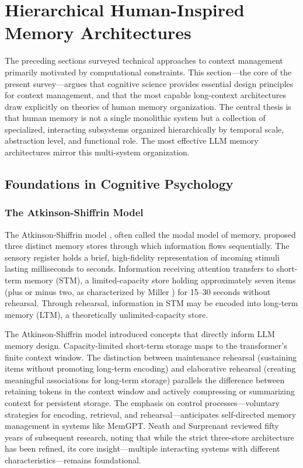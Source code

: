 \documentclass[11pt,letterpaper]{article}
\begin{document}
\section{Hierarchical Human-Inspired Memory Architectures}
\label{sec:hierarchical}

The preceding sections surveyed technical approaches to context management primarily motivated by computational constraints. This section---the core of the present survey---argues that cognitive science provides essential design principles for context management, and that the most capable long-context architectures draw explicitly on theories of human memory organization. The central thesis is that human memory is not a single monolithic system but a collection of specialized, interacting subsystems organized hierarchically by temporal scale, abstraction level, and functional role. The most effective LLM memory architectures mirror this multi-system organization.

\subsection{Foundations in Cognitive Psychology}

\subsubsection{The Atkinson-Shiffrin Model}

The Atkinson-Shiffrin model \cite{atkinson1968human}, often called the modal model of memory, proposed three distinct memory stores through which information flows sequentially. The sensory register holds a brief, high-fidelity representation of incoming stimuli lasting milliseconds to seconds. Information receiving attention transfers to short-term memory (STM), a limited-capacity store holding approximately seven items (plus or minus two, as characterized by Miller \cite{miller1956magical}) for 15--30 seconds without rehearsal. Through rehearsal, information in STM may be encoded into long-term memory (LTM), a theoretically unlimited-capacity store.

The Atkinson-Shiffrin model introduced concepts that directly inform LLM memory design. Capacity-limited short-term storage maps to the transformer's finite context window. The distinction between maintenance rehearsal (sustaining items without promoting long-term encoding) and elaborative rehearsal (creating meaningful associations for long-term storage) parallels the difference between retaining tokens in the context window and actively compressing or summarizing context for persistent storage. The emphasis on control processes---voluntary strategies for encoding, retrieval, and rehearsal---anticipates self-directed memory management in systems like MemGPT. Neath and Surprenant \cite{neath2019fifty} reviewed fifty years of subsequent research, noting that while the strict three-store architecture has been refined, its core insight---multiple interacting systems with different characteristics---remains foundational.
\end{document}
